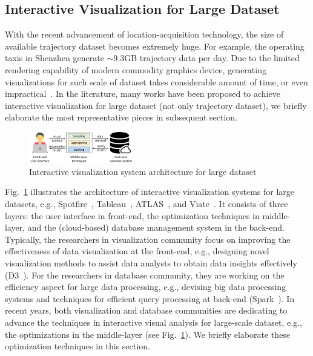 \subsection{Interactive Visualization for Large Dataset}\label{sec:interactive}
{With the recent advancement of location-acquisition technology, the size of available trajectory dataset becomes extremely huge.}
For example, the operating taxis in Shenzhen generate {$\sim$}9.3GB trajectory data per day.
Due to the limited rendering capability of modern commodity graphics device, generating visualizations for such scale of dataset takes considerable amount of time,
or even impractical~\cite{park2016visualization}.
In the literature, many works have been proposed to achieve interactive visualization {for} large dataset (not only trajectory dataset),
we briefly elaborate the most representative pieces in subsequent section. %

\begin{figure}
	\centering
	\includegraphics[width=0.40\textwidth]{pictures/framework/framework.pdf}
	\vspace{-3mm}
	\caption{Interactive visualization system architecture for large dataset} \label{fig:framework}
    \vspace{-6mm}
\end{figure}

Fig.~\ref{fig:framework} illustrates the architecture of interactive visualization systems for large datasets,
e.g., Spotfire~\cite{Spotfire}, Tableau~\cite{Tableau}, ATLAS~\cite{chan2008maintaining}, and Viate~\cite{yang2019vaite}.
{It} consists of three layers: the user interface in front-end, the optimization techniques in middle-layer, and the (cloud-based) database management system in the back-end.
{Typically, the researchers in visualization community focus on improving the effectiveness of data visualization at the front-end,
e.g., designing novel visualization methods to assist data analysts to obtain data insights effectively (D3~\cite{d3}).}
For the researchers in database community, they are working on the efficiency aspect for large data processing, e.g., devising big data processing systems and techniques for efficient query processing at back-end (Spark~\cite{spark}).
In recent years, both visualization and database communities are dedicating to advance the techniques in interactive visual analysis for large-scale dataset,
e.g., the optimizations in the middle-layer (see Fig.~\ref{fig:framework}).
We briefly elaborate these optimization techniques {in this section}. %

